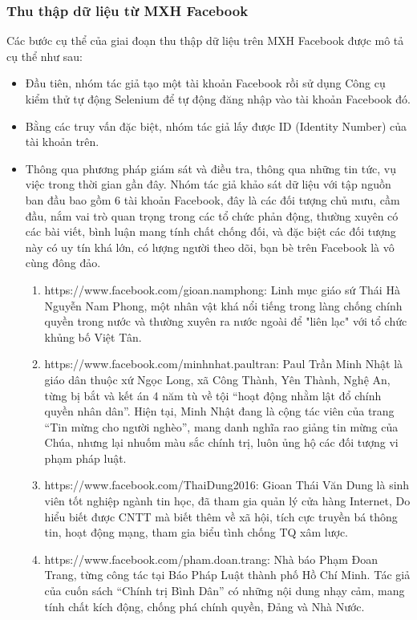 		\subsubsection{Thu thập dữ liệu từ MXH Facebook}
		Các bước cụ thể của giai đoạn thu thập dữ liệu trên MXH Facebook được mô tả cụ thể như sau:
		\begin {itemize}
			\item Đầu tiên, nhóm tác giả tạo một tài khoản Facebook rồi sử dụng Công cụ kiểm thử tự động Selenium để tự động đăng nhập vào tài khoản Facebook đó.
		
			\item Bằng các truy vấn đặc biệt, nhóm tác giả lấy được ID (Identity Number) của tài khoản trên.
		
			\item Thông qua phương pháp giám sát và điều tra, thông qua những tin tức, vụ việc trong thời gian gần đây. Nhóm tác giả khảo sát dữ liệu với tập nguồn ban đầu bao gồm 6 tài khoản Facebook, đây là các đối tượng chủ mưu, cầm đầu, nắm vai trò quan trọng trong các tổ chức phản động, thường xuyên có các bài viết, bình luận mang tính chất chống đối, và đặc biệt các đối tượng này có uy tín khá lớn, có lượng người theo dõi, bạn bè trên Facebook là vô cùng đông đảo.
			\begin {enumerate} [+]
				\item https://www.facebook.com/gioan.namphong: Linh mục giáo sứ Thái Hà Nguyễn Nam Phong, một nhân vật khá nổi tiếng trong làng chống chính quyền trong nước và thường xuyên ra nước ngoài để "liên lạc" với tổ chức khủng bố Việt Tân.
		
				\item https://www.facebook.com/minhnhat.paultran: Paul Trần Minh Nhật là giáo dân thuộc xứ Ngọc Long, xã Công Thành, Yên Thành, Nghệ An, từng bị bắt và kết án 4 năm tù về tội “hoạt động nhằm lật đổ chính quyền nhân dân”. Hiện tại, Minh Nhật đang là cộng tác viên của trang “Tin mừng cho người nghèo”, mang danh nghĩa rao giảng tin mừng của Chúa, nhưng lại nhuốm màu sắc chính trị, luôn ủng hộ các đối tượng vi phạm pháp luật.
		
				\item https://www.facebook.com/ThaiDung2016: Gioan Thái Văn Dung là sinh viên tốt nghiệp ngành tin học, đã tham gia quản lý cửa hàng Internet, Do hiểu biết được CNTT mà biết thêm về xã hội, tích cực truyền bá thông tin, hoạt động mạng, tham gia biểu tình chống TQ xâm lược.
		
				\item https://www.facebook.com/pham.doan.trang: Nhà báo Phạm Đoan Trang, từng công tác tại Báo Pháp Luật thành phố Hồ Chí Minh. Tác giả của cuốn sách “Chính trị Bình Dân” có những nội dung nhạy cảm, mang tính chất kích động, chống phá chính quyền, Đảng và Nhà Nước.
		

\end{enumerate}
\end{itemize}
